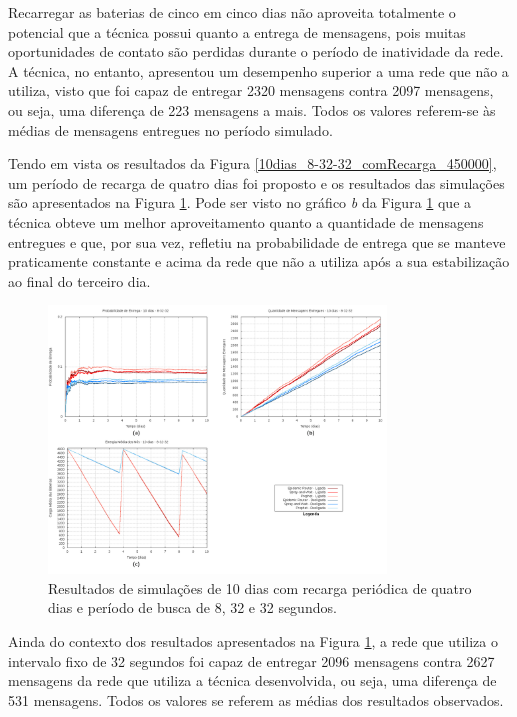 Recarregar as baterias de cinco em cinco dias não aproveita totalmente o potencial que a técnica possui quanto a entrega de mensagens, pois muitas oportunidades de contato são perdidas durante o período de inatividade da rede. A técnica, no entanto, apresentou um desempenho superior a uma rede que não a utiliza, visto que foi capaz de entregar 2320 mensagens contra 2097 mensagens, ou seja, uma diferença de 223 mensagens a mais. Todos os valores referem-se às médias de mensagens entregues no período simulado.

\newpage
Tendo em vista os resultados da Figura \ref{10dias_8-32-32_comRecarga_450000}, um período de recarga de quatro dias foi proposto e os resultados das simulações são apresentados na Figura \ref{10dias_8-32-32_comRecarga_345600}. Pode ser visto no gráfico \emph{b} da Figura \ref{10dias_8-32-32_comRecarga_345600} que a técnica obteve um melhor aproveitamento quanto a quantidade de mensagens entregues e que, por sua vez, refletiu na probabilidade de entrega que se manteve praticamente constante e acima da rede que não a utiliza após a sua estabilização ao final do terceiro dia.

\begin{figure}
\centering
\includegraphics[width=0.8\textwidth]{figuras/cap_5/graficos/8_32_32/MessageDeliveryReport_10_8-32-32_withRecharge_345600.png}
\caption{Resultados de simulações de 10 dias com recarga periódica de quatro dias e período de busca de 8, 32 e 32 segundos.}
\label{10dias_8-32-32_comRecarga_345600}
\end{figure}

Ainda do contexto dos resultados apresentados na Figura \ref{10dias_8-32-32_comRecarga_345600}, a rede que utiliza o intervalo fixo de 32 segundos foi capaz de entregar 2096 mensagens contra 2627 mensagens da rede que utiliza a técnica desenvolvida, ou seja, uma diferença de 531 mensagens. Todos os valores se referem as médias dos resultados observados.

